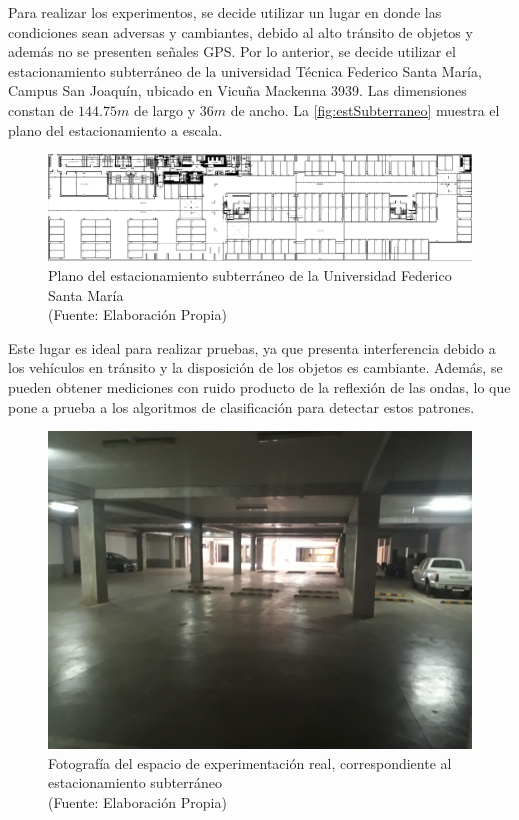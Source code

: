 Para realizar los experimentos, se decide utilizar un lugar en donde las condiciones sean adversas y cambiantes, debido al alto tránsito de objetos y además no se presenten señales GPS. Por lo anterior, se decide utilizar el estacionamiento subterráneo de la universidad Técnica Federico Santa María, Campus San Joaquín, ubicado en Vicuña Mackenna 3939. Las dimensiones constan de $144.75m$ de largo y $36m$ de ancho. La \autoref{fig:estSubterraneo} muestra el plano del estacionamiento a escala.

\begin{figure}[ht!]
\centering
\includegraphics[width=.6\textwidth]{figures/estSubterraneo.png}
\caption[Plano del estacionamiento subterráneo]{Plano del estacionamiento subterráneo de la Universidad Federico Santa María\\
{\scriptsize (Fuente: Elaboración Propia)}}
\label{fig:estSubterraneo}
\end{figure}

Este lugar es ideal para realizar pruebas, ya que presenta interferencia debido a los vehículos en tránsito y la disposición de los objetos es cambiante. Además, se pueden obtener mediciones con ruido producto de la reflexión de las ondas, lo que pone a prueba a los algoritmos de clasificación para detectar estos patrones. 

\begin{figure}[ht!]
\centering
\includegraphics[width=.6\textwidth]{figures/estReal.jpg}
\caption[Lugar de experimentación real]{Fotografía del espacio de experimentación real, correspondiente al estacionamiento subterráneo\\
{\scriptsize (Fuente: Elaboración Propia)}}
\label{fig:estReal}
\end{figure}

